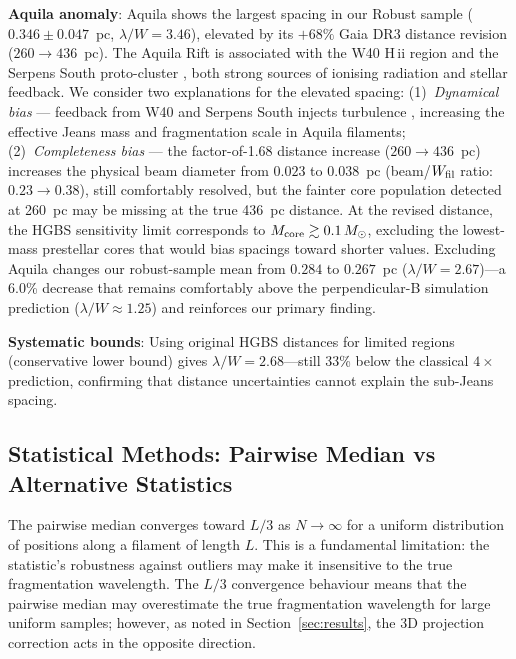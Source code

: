 \documentclass[twoside,twocolumn]{mnras}
\begin{document}
\textbf{Aquila anomaly}: Aquila shows the largest spacing in our Robust sample
($0.346 \pm 0.047$~pc, $\lambda/W = 3.46$), elevated by its $+68\%$ Gaia DR3 distance revision
($260 \to 436$~pc). The Aquila Rift is associated with the W40 H\,{\sc ii} region and the
Serpens South proto-cluster \citep{Andre2010}, both strong sources of ionising radiation and
stellar feedback. We consider two explanations for the elevated spacing: (1)~\textit{Dynamical
bias} --- feedback from W40 and Serpens South injects turbulence \citep{Bontemps2010},
increasing the effective Jeans mass and fragmentation scale in Aquila filaments; (2)~\textit{Completeness
bias} --- the factor-of-1.68 distance increase ($260 \to 436$~pc) increases the physical beam
diameter from $0.023$ to $0.038$~pc (beam/$W_{\rm fil}$ ratio: $0.23 \to 0.38$), still comfortably
resolved, but the fainter core population detected at 260~pc may be missing at the true 436~pc
distance. At the revised distance, the HGBS sensitivity
limit corresponds to $M_{\rm core} \gtrsim 0.1\,M_\odot$, excluding the lowest-mass prestellar
cores that would bias spacings toward shorter values. Excluding Aquila changes our
robust-sample mean from $0.284$ to $0.267$~pc ($\lambda/W = 2.67$)---a 6.0\% decrease that remains
comfortably above the perpendicular-B simulation prediction ($\lambda/W \approx 1.25$) and 
reinforces our primary finding.

\textbf{Systematic bounds}: Using original HGBS distances for limited regions
(conservative lower bound) gives $\lambda/W = 2.68$---still 33\% below the classical
$4\times$ prediction, confirming that distance uncertainties cannot explain the
sub-Jeans spacing.

\subsection{Statistical Methods: Pairwise Median vs Alternative Statistics}
\label{sec:statistics}

The pairwise median converges toward $L/3$ as $N \to \infty$ for a uniform distribution
of positions along a filament of length $L$. This is a fundamental limitation: the
statistic's robustness against outliers may make it insensitive to the true fragmentation
wavelength. The $L/3$ convergence behaviour means that the pairwise median may overestimate the true
fragmentation wavelength for large uniform samples; however, as noted in
Section~\ref{sec:results}, the 3D projection correction acts in the opposite direction.
\end{document}
